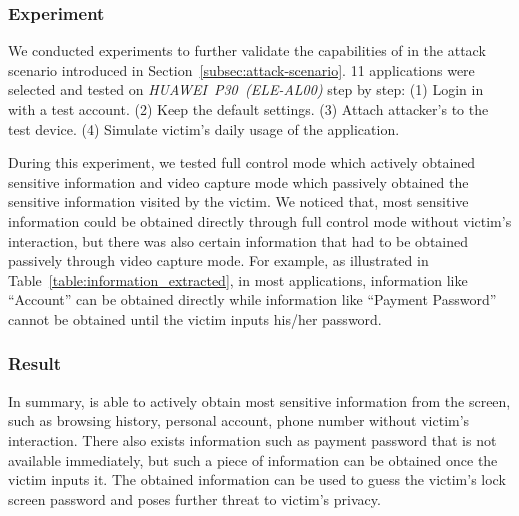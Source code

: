 \subsubsection{Experiment}

We conducted experiments to further validate the capabilities of \tool
in the attack scenario introduced in Section~\ref{subsec:attack-scenario}.
11 applications were selected and tested on \mbox{\textit{HUAWEI P30 (ELE-AL00)}} step by step:
(1) Login in with a test account.
(2) Keep the default settings.
(3) Attach attacker's \tool to the test device.
(4) Simulate victim's daily usage of the application.

During this experiment, we tested full control mode which actively obtained sensitive information and video capture mode which passively obtained the sensitive information visited by the victim. We noticed that, most sensitive information could be obtained directly through full control mode without victim's interaction, but there was also certain information that had to be obtained passively through video capture mode. For example, as illustrated in Table~\ref{table:information_extracted}, in most applications, information like ``Account'' can be obtained directly while information like ``Payment Password'' cannot be obtained until the victim inputs his/her password.

\subsubsection{Result}
In summary, \tool is able to actively obtain most sensitive information from the screen, such as browsing history, personal account, phone number without victim's interaction. There also exists information such as payment password that is not available immediately, but such a piece of information can be obtained once the victim inputs it. The obtained information can be used to guess the victim's lock screen password and poses further threat to victim's privacy.

